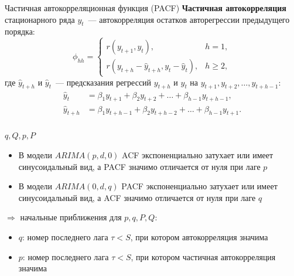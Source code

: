 \documentclass[9pt,pdf,utf8,hyperref={unicode},aspectratio=169]{beamer}
\renewcommand{\geq}{\geqslant}
\begin{document}
\begin{frame}{Частичная автокорреляционная функция (PACF)}
	\textbf{Частичная автокорреляция} стационарного ряда $y_t$~--- автокорреляция остатков авторегрессии предыдущего порядка:
	$$\phi_{hh} = \begin{cases}
	r\left(y_{t+1},y_t\right), & h=1, \\
	r\left(y_{t+h} - \hat{y}_{t+h}, y_{t} - \hat{y}_t\right), & h\geq 2,
	\end{cases}
	$$
	где $\hat{y}_{t+h}$ и $\hat{y}_{t}$~--- предсказания регрессий $y_{t+h}$ и $y_{t}$ на $y_{t+1}, y_{t+2}, \dots, y_{t+h-1}$:
	\begin{align*}
	\hat{y}_t     &= \beta_1y_{t+1} +\beta_2y_{t+2} + \dots + \beta_{h-1} y_{t+h-1}, \\
	\hat{y}_{t+h} &= \beta_1y_{t+h-1} +\beta_2y_{t+h-2} + \dots + \beta_{h-1} y_{t+1}. \\
	\end{align*}	
\end{frame}

\begin{frame}{$q, Q, p, P$}
\begin{itemize}
	\item В модели $ARIMA(p,d,0)$ ACF экспоненциально затухает или имеет синусоидальный вид, а PACF значимо отличается от нуля при лаге $p$
	\item В модели $ARIMA(0,d,q)$ PACF экспоненциально затухает или имеет синусоидальный вид, а ACF значимо отличается от нуля при лаге $q$
\end{itemize}

$\Rightarrow$ начальные приближения для $p,q,P,Q$:

\begin{itemize}
	\item $q$: номер последнего лага $\tau<S$, при котором автокорреляция значима	
	\item $p$: номер последнего лага $\tau<S$, при котором частичная автокорреляция значима		
\end{itemize}
\end{frame}
\end{document}
